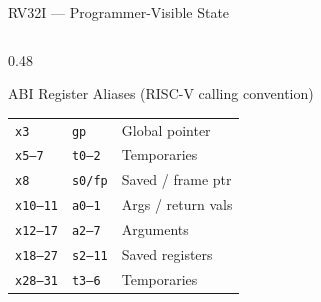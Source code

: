 \documentclass[aspectratio=169,10pt]{beamer}
\begin{document}
\begin{frame}{RV32I --- Programmer-Visible State}
\begin{columns}[T]
\begin{column}{0.48\textwidth}
\begin{block}{ABI Register Aliases (RISC-V calling convention)}
\begin{tabular}{lll}
          \texttt{x3}  & \texttt{gp}   & Global pointer \\
          \texttt{x5--7}  & \texttt{t0--2} & Temporaries \\
          \texttt{x8}  & \texttt{s0/fp} & Saved / frame ptr \\
          \texttt{x10--11} & \texttt{a0--1} & Args / return vals \\
          \texttt{x12--17} & \texttt{a2--7} & Arguments \\
          \texttt{x18--27} & \texttt{s2--11} & Saved registers \\
          \texttt{x28--31} & \texttt{t3--6} & Temporaries \\
          \bottomrule
        \end{tabular}
      \end{block}
    \end{column}
  \end{columns}
\end{frame}
\end{document}
